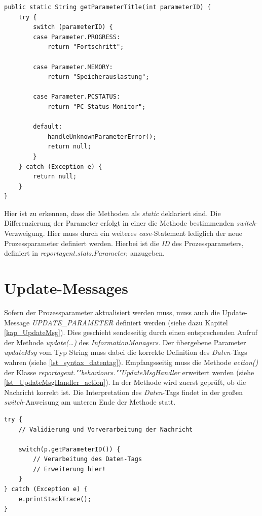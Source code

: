 	\begin{lstlisting}[caption={reportagent.stats.ParameterMap.getParameterTitle()},label={lst_ParameterMap_getParameterTitle}]
public static String getParameterTitle(int parameterID) {
	try {
		switch (parameterID) {
		case Parameter.PROGRESS:
			return "Fortschritt";
			
		case Parameter.MEMORY:
			return "Speicherauslastung";
			
		case Parameter.PCSTATUS:
			return "PC-Status-Monitor";
			
		default:
			handleUnknownParameterError();
			return null;
		}
	} catch (Exception e) {
		return null;
	}
}
	\end{lstlisting}
	
	Hier ist zu erkennen, dass die Methoden als \emph{static} deklariert sind. Die Differenzierung der Parameter erfolgt in einer die Methode bestimmenden \emph{switch}-Verzweigung. Hier muss durch ein weiteres \emph{case}-Statement lediglich der neue Prozessparameter definiert werden. Hierbei ist die \emph{ID} des Prozessparameters, definiert in \emph{reportagent.stats.Parameter}, anzugeben.
	
	\section{Update-Messages}
	Sofern der Prozessparameter aktualisiert werden muss, muss auch die Update-Message \emph{UPDATE\_PARAMETER} definiert werden (siehe dazu Kapitel \ref{kap_UpdateMsg}). Dies geschieht sendeseitig durch einen entsprechenden Aufruf der Methode \emph{update(\ldots)} des \emph{InformationManagers}. Der übergebene Parameter \emph{updateMsg} vom Typ String muss dabei die korrekte Definition des \emph{Daten}-Tags wahren (siehe \lstlistingname{} \ref{lst_syntax_datentag}). Empfangsseitig muss die Methode \emph{action()} der Klasse \emph{reportagent.""behaviours.""Update\-Msg\-Handler} erweitert werden (siehe \lstlistingname{} \ref{lst_UpdateMsgHandler_action}). In der Methode wird zuerst geprüft, ob die Nachricht korrekt ist. Die Interpretation des \emph{Daten}-Tags findet in der großen \emph{switch}-Anweisung am unteren Ende der Methode statt.
	
	\begin{lstlisting}[caption={reportagent.behaviours.UpdateMsgHandler.action()},label={lst_UpdateMsgHandler_action}]
try {
	// Validierung und Vorverarbeitung der Nachricht
	
	switch(p.getParameterID()) {
		// Verarbeitung des Daten-Tags
		// Erweiterung hier!
	}
} catch (Exception e) {
	e.printStackTrace();
}
	\end{lstlisting}

